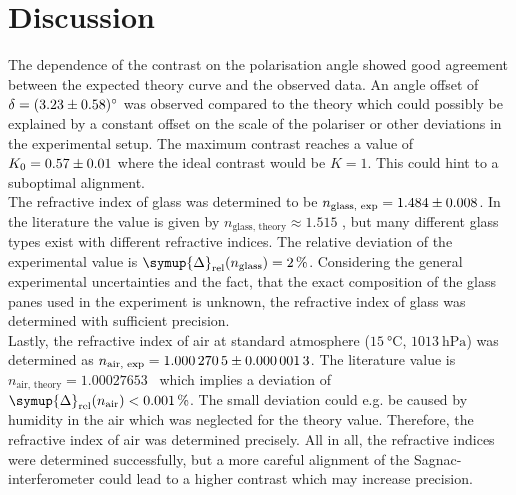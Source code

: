 \section{Discussion}
\label{sec:Diskussion}

The dependence of the contrast on the polarisation angle showed good agreement between the expected theory curve and the observed data. An angle offset of 
$\delta = \qty{3.23 +- 0.58}{\degree}$ was observed compared to the theory which could possibly be explained by a constant offset on the scale of the polariser or other 
deviations in the experimental setup. The maximum contrast reaches a value of $K_0 = \num{0.57 +- 0.01}$ where the ideal contrast would be $K = 1$. This could hint to a 
suboptimal alignment. \\
The refractive index of glass was determined to be $n_\text{glass, exp} = \num{1.484 +- 0.008}$. In the literature the value is given by $n_\text{glass, theory} \approx \num{1.515}$
\cite{Refractive_Index}, but many different glass types exist with different refractive indices.
The relative deviation of the experimental value is $\symup{\Delta}_\text{rel} (n_\text{glass}) = \qty{2}{\percent}$. Considering the general experimental uncertainties and the fact, that the exact 
composition of the glass panes used in the experiment is unknown, the refractive index of glass was determined with sufficient precision.\\
Lastly, the refractive index of air at standard atmosphere ($\qty{15}{\degreeCelsius}$, $\qty{1013}{\hecto\pascal}$) was determined as $n_\text{air, exp} = \num{1.0002705+-0.0000013}$.
The literature value is $n_\text{air, theory} = 1.00027653$~\cite{Refractive_Index} which implies a deviation of $\symup{\Delta}_\text{rel} (n_\text{air}) < \qty{0.001}{\percent}$.
The small deviation could e.g. be caused by humidity in the air which was neglected for the theory value. Therefore, the refractive index of air was determined precisely.
All in all, the refractive indices were determined successfully, but a more careful alignment of the Sagnac-interferometer could lead to a higher contrast which may increase precision.
